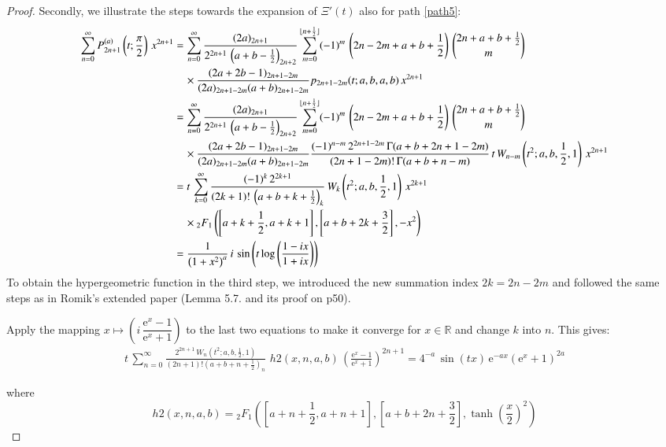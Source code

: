 \documentclass[a4paper,11pt,twoside]{amsart}
\newcommand{\verifiedeq}{=}
\newcommand{\defeq}{=}
\newcommand{\verifiedeq}{\stackrel{\checkmark}{=}}
\newcommand{\defeq}{\stackrel{\scriptscriptstyle \textnormal{def}}{=}}
\begin{document}
\begin{proof}
Secondly, we illustrate the steps towards the expansion of $\Xi'(t)$ also for path \ref{path5}: 
\begin{align}
 \sum_{n=0}^\infty P_{2n+1}^{(a)}\left(t;\frac{\pi}{2}\right)\,x^{2n+1} &\defeq\sum_{n=0}^\infty \frac{(2a)_{2n+1}}{2^{2n+1}\,\left(a+b-\frac12\right)_{2n+2}} \sum_{m=0}^{\lfloor n+\frac12 \rfloor} (-1)^m\,\left(2n-2m+a+b+\frac12\right)\,\binom{2n+a+b+\frac12}{m}\, \notag\\ &\quad\times \frac{(2a+2b-1)_{2n+1-2m}}{(2a)_{2n+1-2m}(a+b)_{2n+1-2m}}  p_{2n+1-2m}(t;a,b,a,b)\,x^{2n+1} \notag \\
 &\defeq\sum_{n=0}^\infty \frac{(2a)_{2n+1}}{2^{2n+1}\,\left(a+b-\frac12\right)_{2n+2}} \sum_{m=0}^{\lfloor n+\frac12 \rfloor} (-1)^m\,\left(2n-2m+a+b+\frac12\right)\,\binom{2n+a+b+\frac12}{m}\, \notag \\ &\quad\times\frac{(2a+2b-1)_{2n+1-2m}}{(2a)_{2n+1-2m}(a+b)_{2n+1-2m}} \frac{(-1)^{n-m}\,2^{2n+1-2m}\,\Gamma(a+b+2n+1-2m)}{(2n+1-2m)!\,\Gamma(a+b+n-m)}\,t\,W_{n-m}\left(t^2;a,b,\frac12,1\right)\,x^{2n+1}\notag \\
 &\defeq t\,\sum_{k=0}^\infty \frac{(-1)^k\,2^{2k+1}}{(2k+1)!\,\left(a+b+k+\frac12\right)_{k}}\,W_k\left(t^2;a,b,\frac12,1\right)\,x^{2k+1}\,\\ &\quad \times{}_2F_1\left(\left[a+k+\frac12, a+k+1\right],\left[a+b+2k+\frac32\right],-x^2\right) \notag \\
 &\defeq \frac{1}{\left(1+x^2\right)^a}\, i\,\sin\left(t\log\left(\frac{1-ix}{1+ix}\right)\right) 
\end{align}
To obtain the hypergeometric function in the third step, we introduced the new summation index $2k = 2n-2m$ and followed the same steps as in Romik's extended paper (Lemma 5.7. and its proof on p50). 

Apply the mapping $x \mapsto \left(i\,\dfrac{\textrm{e}^{x}-1}{\textrm{e}^{x}+1}\right)$ to the last two equations to make it converge for $x \in \mathbb{R}$ and change $k$ into $n$. This gives: 
\begin{align}
t\,\sum_{n=0}^\infty \frac{2^{2n+1}\,W_n\left(t^2;a,b,\frac12,1\right)}{(2n+1)!\left(a+b+n+\frac12\right)_n}\, \,h2(x,n,a,b)\,\left(\frac{\textrm{e}^{x}-1}{\textrm{e}^{x}+1}\right)^{2n+1} \verifiedeq 4^{-a}\,\sin(tx)\,\mathrm{e}^{-ax}\left(\mathrm{e}^x+1\right)^{2a} 
\end{align}

where $$h2(x,n,a,b) \defeq {}_2F_1\left(\left[a+n+\frac12, a+n+1\right],\left[a+b+2n+\frac32\right],\tanh\left(\frac{x}{2}\right)^2\right)$$


\end{proof}
\end{document}
